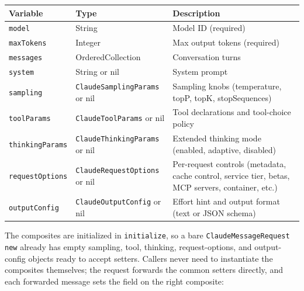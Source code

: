 \documentclass[a4paper,10pt,fleqn]{article}
\newcommand{\cls}[1]{\texttt{#1}}
\begin{document}
\begin{center}
\small
\begin{tabular}{@{}llp{6cm}@{}}
\toprule
\textbf{Variable} & \textbf{Type} & \textbf{Description} \\
\midrule
\texttt{model}          & String                     & Model ID (required) \\
\texttt{maxTokens}      & Integer                    & Max output tokens (required) \\
\texttt{messages}       & OrderedCollection          & Conversation turns \\
\texttt{system}         & String or nil              & System prompt \\
\texttt{sampling}       & \cls{ClaudeSamplingParams} or nil & Sampling knobs (temperature, topP, topK, stopSequences) \\
\texttt{toolParams}     & \cls{ClaudeToolParams} or nil     & Tool declarations and tool-choice policy \\
\texttt{thinkingParams} & \cls{ClaudeThinkingParams} or nil & Extended thinking mode (enabled, adaptive, disabled) \\
\texttt{requestOptions} & \cls{ClaudeRequestOptions} or nil & Per-request controls (metadata, cache control, service tier, betas, MCP servers, container, etc.) \\
\texttt{outputConfig}   & \cls{ClaudeOutputConfig} or nil   & Effort hint and output format (text or JSON schema) \\
\bottomrule
\end{tabular}
\end{center}

The composites are initialized in \texttt{initialize}, so a
bare \texttt{ClaudeMessageRequest new} already has empty
sampling, tool, thinking, request-options, and output-config
objects ready to accept setters.  Callers never need to
instantiate the composites themselves; the request forwards the
common setters directly, and each forwarded message sets the
field on the right composite:
\end{document}
